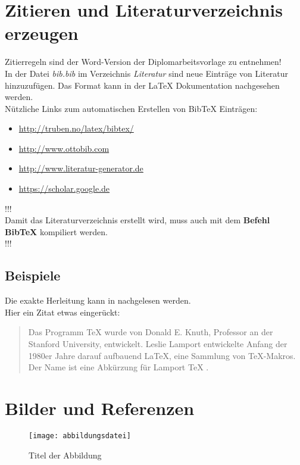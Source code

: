 \section{Zitieren und Literaturverzeichnis erzeugen}
Zitierregeln sind der Word-Version der Diplomarbeitsvorlage zu entnehmen! \\
In der Datei \textit{bib.bib} im Verzeichnis \textit{Literatur} sind neue Eintr\"age von Literatur hinzuzuf\"ugen. Das Format kann in der \LaTeX{} Dokumentation nachgesehen werden. \\
N\"utzliche Links zum automatischen Erstellen von BibTeX Eintr\"agen:
\begin{itemize}
	\item \url{http://truben.no/latex/bibtex/}
	\item \url{http://www.ottobib.com}
	\item \url{http://www.literatur-generator.de}
	\item \url{https://scholar.google.de}
\end{itemize}

\begin{center}
\Large{!!! \\Damit das Literaturverzeichnis erstellt wird, muss auch mit dem \textbf{Befehl BibTeX} kompiliert werden.\\ !!!}
\end{center}


\subsection{Beispiele}
Die exakte Herleitung kann in \cite{Prager1961} nachgelesen werden. \\
Hier ein Zitat etwas einger\"uckt:
\begin{quote}
Das Programm TeX wurde von Donald E. Knuth, Professor an der Stanford University, entwickelt. Leslie Lamport entwickelte Anfang der 1980er Jahre darauf aufbauend LaTeX, eine Sammlung von TeX-Makros. Der Name ist eine Abk\"urzung f\"ur Lamport TeX \cite{latextug}.
\end{quote}

\section{Bilder und Referenzen}
\begin{figure}[htbp]
\centering
\texttt{[image: abbildungsdatei]}
\caption{Titel der Abbildung} 
\label{fig:bild1}
\end{figure}

